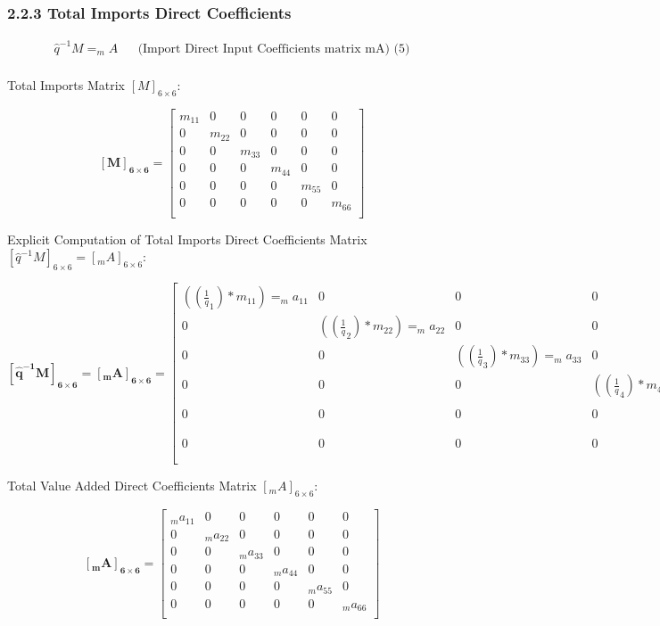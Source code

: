 \documentclass[
  letterpaper,
  DIV=11,
  numbers=noendperiod]{scrreprt}
\begin{document}
\subsubsection{2.2.3 Total Imports Direct
Coefficients}\label{total-imports-direct-coefficients}

\[
\begin{align}
    \hat{q}^{-1}M = _{m}A && \text{(Import Direct Input Coefficients matrix mA) (5)}\\
\end{align}
\]

Total Imports Matrix \([M]_{6\times 6}\):

\[\mathbf {[M]_{6\times 6}} = \left[\begin{array}
{rrr}
m_{11} & 0 & 0 & 0 & 0 & 0 \\
0 & m_{22} & 0 & 0 & 0 & 0 \\
0 & 0 & m_{33} & 0 & 0 & 0 \\
0 & 0 & 0 & m_{44} & 0 & 0 \\
0 & 0 & 0 & 0 & m_{55} & 0 \\
0 & 0 & 0 & 0 & 0 & m_{66} \\
\end{array}\right]
\]

Explicit Computation of Total Imports Direct Coefficients Matrix
\([\hat{q}^{-1}M]_{6\times 6}=[_{m}A]_{6\times 6}\):

\[\mathbf{[\hat{q}^{-1}M]_{6\times 6}=[_{m}A]_{6\times 6}} = \left[\begin{array}
{rrr}
((\frac{1} q_{1})*m_{11})=_{m}a_{11} & 0 & 0 & 0 & 0 & 0 \\
0 & ((\frac{1} q_{2})*m_{22})=_{m}a_{22} & 0 & 0 & 0 & 0 \\
0 & 0 & ((\frac{1} q_{3})*m_{33})=_{m}a_{33} & 0 & 0 & 0 \\
0 & 0 & 0 & ((\frac{1} q_{4})*m_{43})=_{m}a_{44} & 0 & 0 \\
0 & 0 & 0 & 0 & ((\frac{1} q_{5})*m_{55})=_{m}a_{55} & 0 \\
0 & 0 & 0 & 0 & 0 & ((\frac{1} q_{6})*m_{66})=_{m}a_{66} \\
\end{array}\right]
\]

Total Value Added Direct Coefficients Matrix \([_{m}A]_{6\times 6}\):

\[\mathbf{[_{m}A]_{6\times 6}} = \left[\begin{array}
{rrr}
_{m}a_{11} &0 & 0 & 0 & 0 & 0 \\
0 & _{m}a_{22} & 0 & 0 & 0 & 0 \\
0 & 0 & _{m}a_{33} & 0 & 0 & 0 \\
0 & 0 & 0 & _{m}a_{44} & 0 & 0 \\
0 & 0 & 0 & 0 & _{m}a_{55} & 0 \\
0 & 0 & 0 & 0 & 0 & _{m}a_{66} \\
\end{array}\right]
\]
\end{document}
